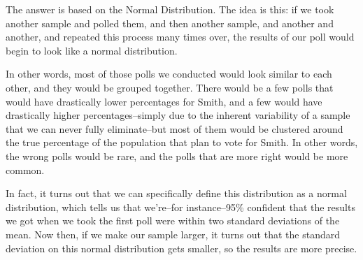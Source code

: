 The answer is based on the Normal Distribution.  The idea is this: if we took another sample and polled them, and then another sample, and another and another, and repeated this process many times over, the results of our poll would begin to look like a normal distribution.
\begin{center}
\end{center}

In other words, most of those polls we conducted would look similar to each other, and they would be grouped together.  There would be a few polls that would have drastically lower percentages for Smith, and a few would have drastically higher percentages--simply due to the inherent variability of a sample that we can never fully eliminate--but most of them would be clustered around the true percentage of the population that plan to vote for Smith.  In other words, the wrong polls would be rare, and the polls that are more right would be more common.

In fact, it turns out that we can specifically define this distribution as a normal distribution, which tells us that we're--for instance--95\% confident that the results we got when we took the first poll were within two standard deviations of the mean.  Now then, if we make our sample larger, it turns out that the standard deviation on this normal distribution gets smaller, so the results are more precise.

\begin{center}
\end{center}

